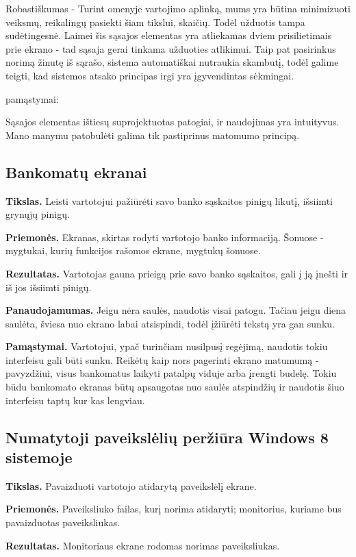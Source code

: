 ﻿\documentclass[a4paper, 12pt]{article}
\begin{document}
		Robastiškumas - Turint omenyje vartojimo aplinką, mums yra būtina minimizuoti veiksmų, reikalingų pasiekti šiam tikslui, skaičių.
		Todėl užduotis tampa sudėtingesnė.
		Laimei šis sąsajos elementas yra atliekamas dviem prisilietimais prie ekrano - tad sąsaja gerai tinkama užduoties atlikimui.
		Taip pat pasirinkus norimą žinutę iš sąrašo, sistema automatiškai nutraukia skambutį, todėl galime teigti, kad sistemos atsako principas irgi yra įgyvendintas sėkmingai.

		pamąstymai:

		Sąsajos elementas ištiesų suprojektuotas patogiai, ir naudojimas yra intuityvus.
		Mano manymu patobulėti galima tik pastiprinus matomumo principą. 
	
	\subsection{Bankomatų ekranai}
		\textbf{Tikslas.}
		Leisti vartotojui pažiūrėti savo banko sąskaitos pinigų likutį, išsiimti grynųjų pinigų.

		\textbf{Priemonės.}
		Ekranas, skirtas rodyti vartotojo banko informaciją.
		Šonuose - mygtukai, kurių funkcijos rašomos ekrane, mygtukų šonuose.

		\textbf{Rezultatas.}
		Vartotojas gauna prieigą prie savo banko sąskaitos, gali į ją įnešti ir iš jos išsiimti pinigų.

		\textbf{Panaudojamumas.}
		Jeigu nėra saulės, naudotis visai patogu.
		Tačiau jeigu diena saulėta, šviesa nuo ekrano labai atsispindi, todėl įžiūrėti tekstą yra gan sunku.

		\textbf{Pamąstymai.}
		Vartotojui, ypač turinčiam nusilpusį regėjimą, naudotis tokiu interfeisu gali būti sunku.
		Reikėtų kaip nors pagerinti ekrano matumumą - pavyzdžiui, visus bankomatus laikyti patalpų viduje arba įrengti budelę.
		Tokiu būdu bankomato ekranas būtų apsaugotas nuo saulės atspindžių ir naudotis šiuo interfeisu taptų kur kas lengviau.

		
	\subsection{Numatytoji paveikslėlių peržiūra Windows 8 sistemoje}
		\textbf{Tikslas.}
		Pavaizduoti vartotojo atidarytą paveikslėlį ekrane.
		
		\textbf{Priemonės.}
		Paveiksliuko failas, kurį norima atidaryti; monitorius, kuriame bus pavaizduotas paveiksliukas.

		\textbf{Rezultatas.}
		Monitoriaus ekrane rodomas norimas paveiksliukas.
\end{document}
